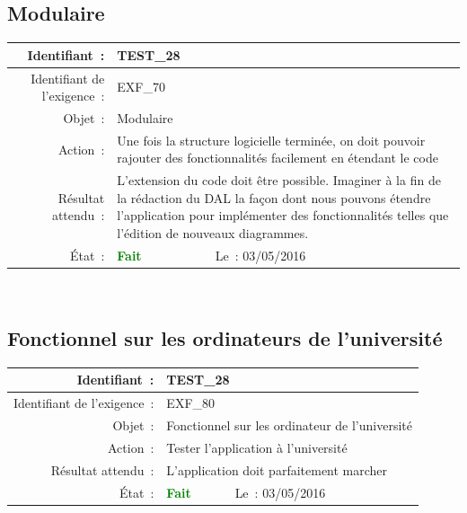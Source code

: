 \documentclass[hidelinks, a4paper,11pt,twoside,final]{article}
\begin{document}
    \subsection*{Modulaire}
    \begin{tabular}{|r|p{5cm}|p{5cm}|}\hline
    {Identifiant~:} & \multicolumn{2}{|p{10cm}|}{TEST\_28} \\\hline
    {Identifiant de l’exigence~:} & \multicolumn{2}{|p{10cm}|}{EXF\_70} \\\hline
        {Objet~:} & \multicolumn{2}{|p{10cm}|}{Modulaire} \\\hline
        {Action~:} & \multicolumn{2}{|p{10cm}|}{Une fois la structure logicielle terminée, on doit pouvoir rajouter des fonctionnalités facilement en étendant le code} \\\hline
        {Résultat attendu~:} & \multicolumn{2}{|p{10cm}|}{L’extension du code doit être possible. Imaginer à la fin de la rédaction du DAL la façon dont nous
        pouvons étendre l’application pour implémenter des fonctionnalités telles que l’édition de nouveaux diagrammes.} \\\hline
        {État~:} & {\textcolor{green}{\textbf{Fait}}} & {Le~: 03/05/2016 } \\\hline
    \end{tabular}
    \\
    \newline

    \subsection*{Fonctionnel sur les ordinateurs de l’université}
    \begin{tabular}{|r|p{5cm}|p{5cm}|}\hline
    {Identifiant~:} & \multicolumn{2}{|p{10cm}|}{TEST\_28} \\\hline
    {Identifiant de l’exigence~:} & \multicolumn{2}{|p{10cm}|}{EXF\_80} \\\hline
        {Objet~:} & \multicolumn{2}{|p{10cm}|}{Fonctionnel sur les ordinateur de l'université} \\\hline
        {Action~:} & \multicolumn{2}{|p{10cm}|}{Tester l’application à l’université} \\\hline
        {Résultat attendu~:} & \multicolumn{2}{|p{10cm}|}{L’application doit parfaitement marcher} \\\hline
        {État~:} & {\textcolor{green}{\textbf{Fait}}} & {Le~: 03/05/2016 } \\\hline
    \end{tabular}
    \\
    \newline         
\end{document}
